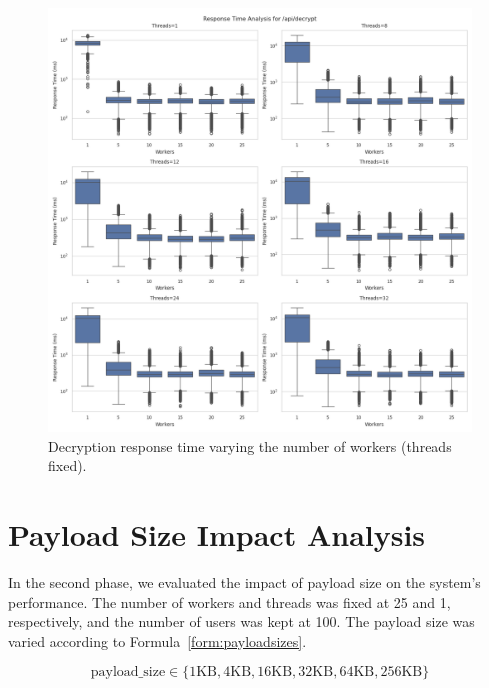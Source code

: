 \documentclass[cic,tc,english]{iiufrgs}
\numberwithin{algorithm}{chapter}
\begin{document}
        \begin{figure}
            \centering
            \includegraphics[width=\textwidth]{images/phase1/api_decrypt/response_time_threads_summary.png}
            \caption{Decryption response time varying the number of workers (threads fixed).}
            \label{fig:decrypt_response_time_threads}
        \end{figure}


        \section{Payload Size Impact Analysis}
        \label{subsec:phase2_payload}

            In the second phase, we evaluated the impact of payload size on the system's performance. The number of workers and threads was fixed at 25 and 1, respectively, and the number of users was kept at 100. The payload size was varied according to Formula~\ref{form:payloadsizes}.

            \begin{equation}
            \label{form:payloadsizes}
                \text{payload\_size} \in \{1\text{KB}, 4\text{KB}, 16\text{KB}, 32\text{KB}, 64\text{KB}, 256\text{KB}\}
            \end{equation}
\end{document}

